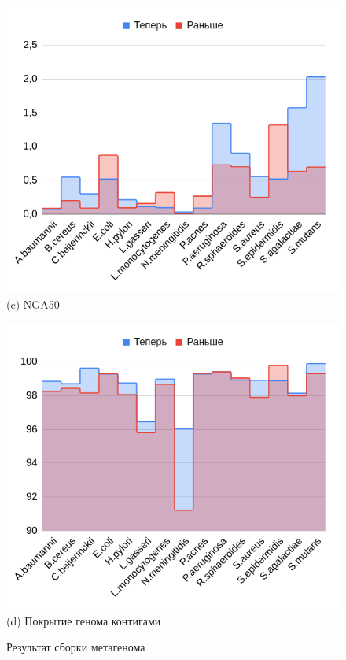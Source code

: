 \documentclass[14pt]{matmex-diploma-custom}
\begin{document}
\begin{figure}[h]
\begin{minipage}{0.5\textwidth}
\end{minipage}
\begin{minipage}{0.5\textwidth}
	\centering
	\includegraphics[scale=0.4]{nga3.png} \small{(c) NGA50}
\end{minipage}
\begin{minipage}{0.5\textwidth}
	\centering
	\includegraphics[scale=0.4]{cov3.png} \small{(d) Покрытие генома контигами}
\end{minipage}
\caption{Результат сборки метагенома}
\label{fig:test3}
\end{figure}
\end{document}
